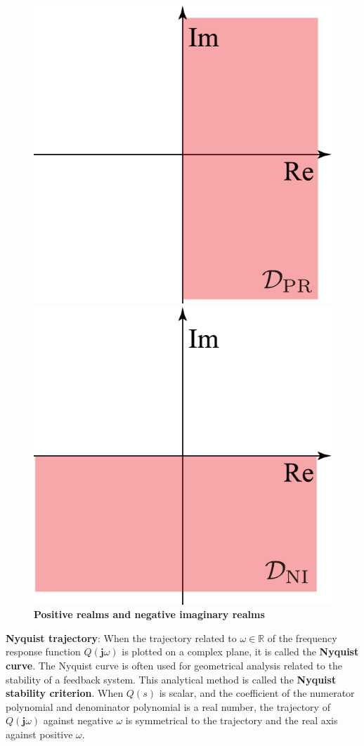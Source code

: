 \documentclass[tombow,dvipdfmx]{corona-a5-1.1}
\begin{document}
\begin{figure}[t]
  \centering
  {
  \begin{minipage}{0.49\linewidth}
    \centering
    \includegraphics[width = .65\linewidth]{figs/PRdom}
    \medskip
  \end{minipage}
  \begin{minipage}{0.49\linewidth}
    \centering
    \includegraphics[width = .65\linewidth]{figs/NIdom}
    \medskip
  \end{minipage}
  }
  \medskip
  \caption{\textbf{Positive realms and negative imaginary realms}}
  \label{fig:PRandNI}
\medskip
\end{figure}


\begin{COLUMN}
\noindent \textbf{Nyquist trajectory}:
When the trajectory related to $\omega \in \mathbb{R}$ of the frequency response function $Q(\bm{j} \omega)$ is plotted on a complex plane, it is called the \textbf{Nyquist curve}.
The Nyquist curve is often used for geometrical analysis related to the stability of a feedback system.
This analytical method is called the \textbf{Nyquist stability criterion}.
When $Q(s)$ is scalar, and the coefficient of the numerator polynomial and denominator polynomial is a real number, the trajectory of $Q(\bm{j} \omega)$ against negative $\omega$ is symmetrical to the trajectory and the real axis against positive $\omega$.
\end{COLUMN}
\end{document}
